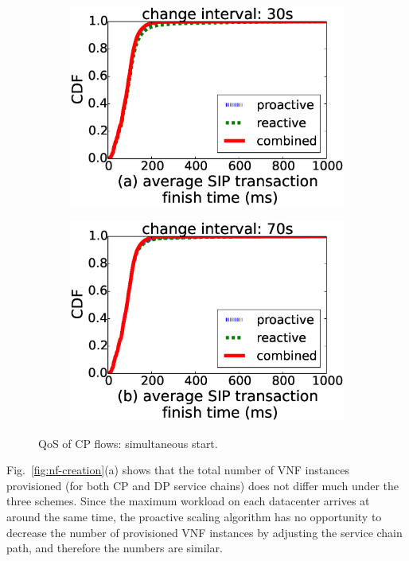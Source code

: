 \begin{figure}[!t]
  \begin{subfigure}[t]{0.49\linewidth}
   \centering
   \includegraphics[width=\columnwidth]{chap-scalims/figure/syn-cp1.eps}
  \end{subfigure}
  \begin{subfigure}[t]{0.49\linewidth}
     \centering
     \includegraphics[width=\columnwidth]{chap-scalims/figure/syn-cp2.eps}
    \end{subfigure}
\caption{QoS of CP flows: simultaneous start.}
\label{fig:syn-cp}
\vspace{-5mm}
\end{figure}

Fig.~\ref{fig:nf-creation}(a) shows that the total number of VNF instances provisioned (for both CP and DP service chains) does not differ much under the three schemes. Since the maximum workload on each datacenter arrives at around the same time, the proactive scaling algorithm has no opportunity to decrease the number of provisioned VNF instances by adjusting the service chain path, and therefore the numbers are similar.


